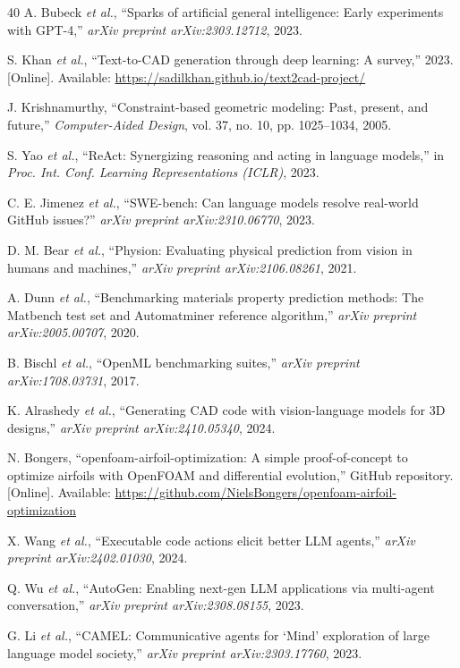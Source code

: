 \documentclass[conference]{IEEEtran}
\begin{document}
\begin{thebibliography}{40}
A. Bubeck \emph{et al.}, ``Sparks of artificial general intelligence: Early experiments with GPT-4,'' \emph{arXiv preprint arXiv:2303.12712}, 2023.

S. Khan \emph{et al.}, ``Text-to-CAD generation through deep learning: A survey,'' 2023. [Online]. Available: \url{https://sadilkhan.github.io/text2cad-project/}

J. Krishnamurthy, ``Constraint-based geometric modeling: Past, present, and future,'' \emph{Computer-Aided Design}, vol. 37, no. 10, pp. 1025--1034, 2005.

S. Yao \emph{et al.}, ``ReAct: Synergizing reasoning and acting in language models,'' in \emph{Proc. Int. Conf. Learning Representations (ICLR)}, 2023.

C. E. Jimenez \emph{et al.}, ``SWE-bench: Can language models resolve real-world GitHub issues?'' \emph{arXiv preprint arXiv:2310.06770}, 2023.

D. M. Bear \emph{et al.}, ``Physion: Evaluating physical prediction from vision in humans and machines,'' \emph{arXiv preprint arXiv:2106.08261}, 2021.

A. Dunn \emph{et al.}, ``Benchmarking materials property prediction methods: The Matbench test set and Automatminer reference algorithm,'' \emph{arXiv preprint arXiv:2005.00707}, 2020.

B. Bischl \emph{et al.}, ``OpenML benchmarking suites,'' \emph{arXiv preprint arXiv:1708.03731}, 2017.

K. Alrashedy \emph{et al.}, ``Generating CAD code with vision-language models for 3D designs,'' \emph{arXiv preprint arXiv:2410.05340}, 2024.

N. Bongers, ``openfoam-airfoil-optimization: A simple proof-of-concept to optimize airfoils with OpenFOAM and differential evolution,'' GitHub repository. [Online]. Available: \url{https://github.com/NielsBongers/openfoam-airfoil-optimization}

X. Wang \emph{et al.}, ``Executable code actions elicit better LLM agents,'' \emph{arXiv preprint arXiv:2402.01030}, 2024.

Q. Wu \emph{et al.}, ``AutoGen: Enabling next-gen LLM applications via multi-agent conversation,'' \emph{arXiv preprint arXiv:2308.08155}, 2023.

G. Li \emph{et al.}, ``CAMEL: Communicative agents for `Mind' exploration of large language model society,'' \emph{arXiv preprint arXiv:2303.17760}, 2023.


\end{thebibliography}
\end{document}
